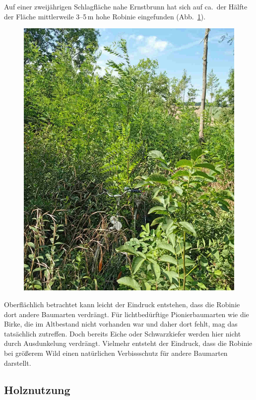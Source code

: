\documentclass[twocolumn]{scrartcl}
\begin{document}
Auf einer zweijährigen Schlagfläche nahe Ernstbrunn hat sich auf
ca.\ der Hälfte der Fläche mittlerweile 3--5\,m hohe Robinie
eingefunden (Abb.~\ref{fig:ernstbrunnSchlagflaeche}).

\begin{figure}[htbp]
  \centering
  \includegraphics[width=.9\linewidth]{./bild/ernstbrunnSchlagflaeche}
  \label{fig:ernstbrunnSchlagflaeche}
\end{figure}

Oberflächlich betrachtet kann leicht der Eindruck entstehen, dass die
Robinie dort andere Baumarten verdrängt. Für lichtbedürftige
Pionierbaumarten wie die Birke, die im Altbestand nicht vorhanden war
und daher dort fehlt, mag das tatsächlich zutreffen. Doch bereits
Eiche oder Schwarzkiefer werden hier nicht durch Ausdunkelung
verdrängt. Vielmehr entsteht der Eindruck, dass die Robinie bei
größerem Wild einen natürlichen Verbissschutz für andere Baumarten
darstellt.

\subsection{Holznutzung}
\end{document}

